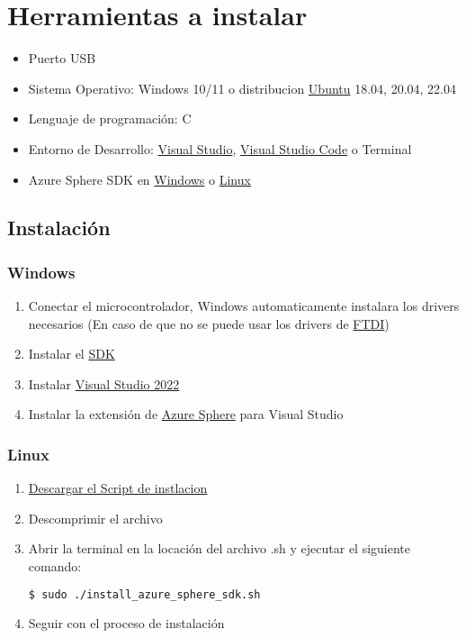 \section{Herramientas a instalar}

\begin{itemize}
	\item 
	Puerto USB
	\item
	Sistema Operativo: Windows 10/11 o 
	distribucion \href{https://ubuntu.com/}{Ubuntu} 18.04, 20.04, 22.04
	\item 
	Lenguaje de programación: C
	\item 
	Entorno de Desarrollo: \href{https://visualstudio.microsoft.com/es/}{Visual Studio}, 
	\href{https://code.visualstudio.com/}{Visual Studio Code} o Terminal
	\item
	Azure Sphere SDK en \href{https://learn.microsoft.com/en-us/azure-sphere/install/install-sdk}{Windows} o \href{https://learn.microsoft.com/en-us/azure-sphere/install/install-sdk-linux}{Linux}
\end{itemize}

\subsection{Instalación}
\subsubsection{Windows}
\begin{enumerate}
	\item 
	Conectar el microcontrolador, Windows automaticamente instalara los drivers necesarios (En caso de que no se puede usar los drivers de \href{https://www.ftdichip.com/Drivers/VCP.htm}{FTDI})
	\item 
	Instalar el \href{https://aka.ms/AzureSphereSDKDownload/Windows}{SDK}
	\item 
	Instalar \href{https://visualstudio.microsoft.com/downloads/}{Visual Studio 2022}
	\item 
	Instalar la extensión de \href{https://marketplace.visualstudio.com/items?itemName=AzureSphereTeam.AzureSphereSDKforVisualStudio2022}{Azure Sphere} para Visual Studio
\end{enumerate}
\subsubsection{Linux}
\begin{enumerate}
	\item 
	\href{https://aka.ms/AzureSphereSDKInstall/Linux}{Descargar el Script de instlacion}
	\item 
	Descomprimir el archivo
	\item 
	
	Abrir la terminal en la locación del archivo .sh y ejecutar el siguiente comando:
	\begin{lstlisting}[language=bash]
$ sudo ./install_azure_sphere_sdk.sh
	\end{lstlisting}
	\item Seguir con el proceso de instalación
	
\end{enumerate}